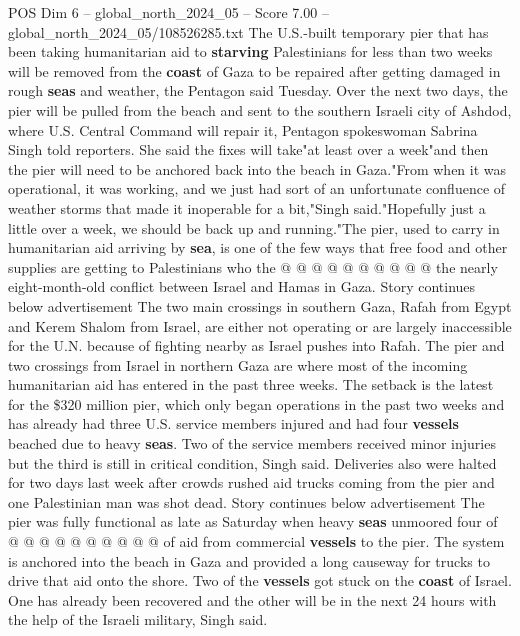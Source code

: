 \begin{textsample}{POS Dim 6 – global\_north\_2024\_05 – Score 7.00 – global\_north\_2024\_05/108526285.txt}  \label{ex:f6_pos_169}
The U.S.-built temporary pier that has been taking humanitarian aid to \textbf{starving} Palestinians for less than two weeks will be removed from the \textbf{coast} of Gaza to be repaired after getting damaged in rough \textbf{seas} and weather, the Pentagon said Tuesday.
Over the next two days, the pier will be pulled from the beach and sent to the southern Israeli city of Ashdod, where U.S.
Central Command will repair it, Pentagon spokeswoman Sabrina Singh told reporters.
She said the fixes will take"at least over a week"and then the pier will need to be anchored back into the beach in Gaza."From when it was operational, it was working, and we just had sort of an unfortunate confluence of weather storms that made it inoperable for a bit,"Singh said."Hopefully just a little over a week, we should be back up and running."The pier, used to carry in humanitarian aid arriving by \textbf{sea}, is one of the few ways that free food and other supplies are getting to Palestinians who the @ @ @ @ @ @ @ @ @ @ the nearly eight-month-old conflict between Israel and Hamas in Gaza.
Story continues below advertisement The two main crossings in southern Gaza, Rafah from Egypt and Kerem Shalom from Israel, are either not operating or are largely inaccessible for the U.N. because of fighting nearby as Israel pushes into Rafah.
The pier and two crossings from Israel in northern Gaza are where most of the incoming humanitarian aid has entered in the past three weeks.
The setback is the latest for the \$320 million pier, which only began operations in the past two weeks and has already had three U.S. service members injured and had four \textbf{vessels} beached due to heavy \textbf{seas}.
Two of the service members received minor injuries but the third is still in critical condition, Singh said.
Deliveries also were halted for two days last week after crowds rushed aid trucks coming from the pier and one Palestinian man was shot dead.
Story continues below advertisement The pier was fully functional as late as Saturday when heavy \textbf{seas} unmoored four of @ @ @ @ @ @ @ @ @ @ of aid from commercial \textbf{vessels} to the pier.
The system is anchored into the beach in Gaza and provided a long causeway for trucks to drive that aid onto the shore.
Two of the \textbf{vessels} got stuck on the \textbf{coast} of Israel.
One has already been recovered and the other will be in the next 24 hours with the help of the Israeli military, Singh said.

\end{textsample}
